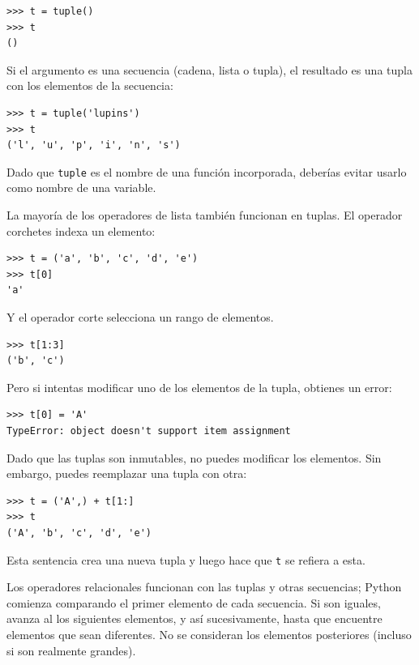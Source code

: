 \documentclass[10pt]{book}
\begin{document}
\begin{verbatim}
>>> t = tuple()
>>> t
()
\end{verbatim}
%
Si el argumento es una secuencia (cadena, lista o tupla), el resultado
es una tupla con los elementos de la secuencia:

\begin{verbatim}
>>> t = tuple('lupins')
>>> t
('l', 'u', 'p', 'i', 'n', 's')
\end{verbatim}
%
Dado que {\tt tuple} es el nombre de una función incorporada, deberías
evitar usarlo como nombre de una variable.

La mayoría de los operadores de lista también funcionan en tuplas.  El operador corchetes
indexa un elemento:

\begin{verbatim}
>>> t = ('a', 'b', 'c', 'd', 'e')
>>> t[0]
'a'
\end{verbatim}
%
Y el operador corte selecciona un rango de elementos.

\begin{verbatim}
>>> t[1:3]
('b', 'c')
\end{verbatim}
%
Pero si intentas modificar uno de los elementos de la tupla, obtienes
un error:

\begin{verbatim}
>>> t[0] = 'A'
TypeError: object doesn't support item assignment
\end{verbatim}
%
Dado que las tuplas son inmutables, no puedes modificar los elementos.  Sin embargo,
puedes reemplazar una tupla con otra:

\begin{verbatim}
>>> t = ('A',) + t[1:]
>>> t
('A', 'b', 'c', 'd', 'e')
\end{verbatim}
%
Esta sentencia crea una nueva tupla y luego hace que {\tt t} se refiera a esta.

Los operadores relacionales funcionan con las tuplas y otras secuencias;
Python comienza comparando el primer elemento de cada
secuencia.  Si son iguales, avanza al los siguientes elementos,
y así sucesivamente, hasta que encuentre elementos que sean diferentes.  No se consideran
los elementos posteriores (incluso si son realmente grandes).
\end{document}
